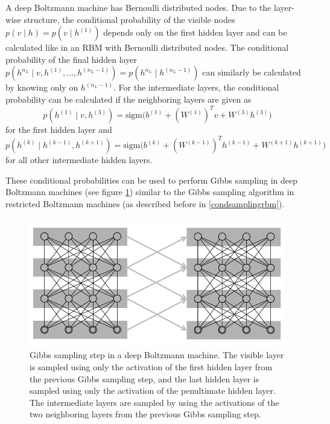\documentclass[12pt]{article}
\newcommand{\sigm}{\mathrm{sigm}}
\begin{document}
A deep Boltzmann machine has Bernoulli distributed nodes.
Due to the layer-wise structure, the conditional probability of the visible nodes $p(v \mid h) = p(v \mid h^{(1)})$ depends only on the first hidden layer and can be calculated like in an RBM with Bernoulli distributed nodes.
The conditional probability of the final hidden layer $p \left( h^{n_L} \mid v, h^{(1)}, \dots, h^{(n_L -1)} \right) = p \left( h^{n_L} \mid h^{(n_L -1)} \right)$ can similarly be calculated by knowing only on $h^{(n_L-1)}$.
For the intermediate layers, the conditional probability can be calculated if the neighboring layers are given as
\begin{equation}
p\left(h^{(1)} \mid v, h^{(3)}\right) = \sigm \bigg( b^{(1)} + (W^{(1)})^T v + W^{(3)} h^{(3)} \bigg)
\label{dbmcondprobfirsthidden}
\end{equation}
for the first hidden layer and 
\begin{equation}
p\left(h^{(k)} \mid h^{(k-1)}, h^{(k+1)} \right) = \sigm \bigg( b^{(k)} + (W^{(k-1)})^T h^{(k-1)} + W^{(k+1)} h^{(k+1)} \bigg)
\label{dbmcondprobintermediate}
\end{equation}
for all other intermediate hidden layers.

These conditional probabilities can be used to perform Gibbs sampling in deep Boltzmann machines (see figure \ref{fig:dbmsampling}) similar to the Gibbs sampling algorithm in restricted Boltzmann machines (as described before in \ref{condsamplingrbm}).

\begin{figure}[h]
   \centering
   \includegraphics[scale=1.0]{images/dbmsampling.pdf}
   \caption{Gibbs sampling step in a deep Boltzmann machine. The visible layer is sampled using only the activation of the first hidden layer from the previous Gibbs sampling step, and the last hidden layer is sampled using only the activation of the penultimate hidden layer. The intermediate layers are sampled by using the activations of the two neighboring layers from the previous Gibbs sampling step. }
   \label{fig:dbmsampling}
 \end{figure}
\end{document}
